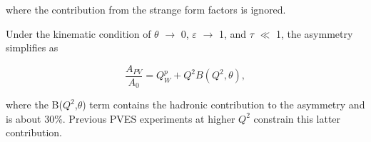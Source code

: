 \noindent
where the contribution from the strange form factors is ignored.

Under the kinematic condition of $\theta$ $\rightarrow$ 0, $\varepsilon$ $\rightarrow$ 1, and $\tau$ $\ll$ 1, the asymmetry simplifies as 

\begin{equation} \label{equ:qweak15}
\frac{A_{PV}}{A_{0}} = Q_{W}^{p} + Q^{2}B(Q^{2}, \theta),
\end{equation}

\noindent
where the B($Q^{2}$,$\theta$) term contains the hadronic contribution to the asymmetry and is about 30\%. Previous PVES experiments at higher $Q^{2}$ constrain this latter contribution.




%

%

